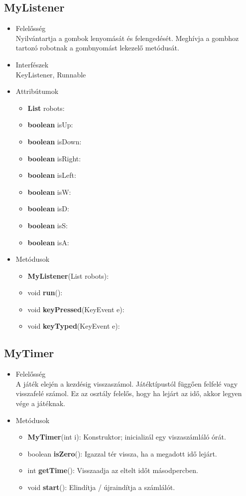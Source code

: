 \subsection{MyListener}
\begin{itemize}
\item Felelősség\\
Nyilvántartja a gombok lenyomását és felengedését. Meghívja a gombhoz tartozó robotnak a gombnyomást lekezelő metódusát.
\item Interfészek\\
KeyListener, Runnable
\item Attribútumok
	\begin{itemize}
	    \item \textbf{List} robots: 
		\item \textbf{boolean} isUp: 
		\item \textbf{boolean} isDown: 
		\item \textbf{boolean} isRight: 
		\item \textbf{boolean} isLeft: 
		\item \textbf{boolean} isW: 
		\item \textbf{boolean} isD: 
		\item \textbf{boolean} isS: 
		\item \textbf{boolean} isA: 
	\end{itemize}
\item Metódusok
	\begin{itemize}
		\item \textbf{MyListener}(List robots): 
		\item void \textbf{run}():  
		\item void \textbf{keyPressed}(KeyEvent e): 
		\item void \textbf{keyTyped}(KeyEvent e): 
	\end{itemize}
\end{itemize}

\subsection{MyTimer}
\begin{itemize}
\item Felelősség\\
A játék elején a kezdésig visszaszámol. Játéktípustól függően felfelé vagy visszafelé számol. Ez az osztály felelős, hogy ha lejárt az idő, akkor legyen vége a játéknak.
\item Metódusok
	\begin{itemize}
		\item \textbf{MyTimer}(int i): Konstruktor; inicializál egy viszaszámláló órát.
		\item boolean \textbf{isZero}(): Igazzal tér vissza, ha a megadott idő lejárt.
		\item int \textbf{getTime}(): Visszaadja az eltelt időt másodpercben.
		\item void \textbf{start}(): Elindítja / újraindítja a számlálót.
	\end{itemize}
\end{itemize}


